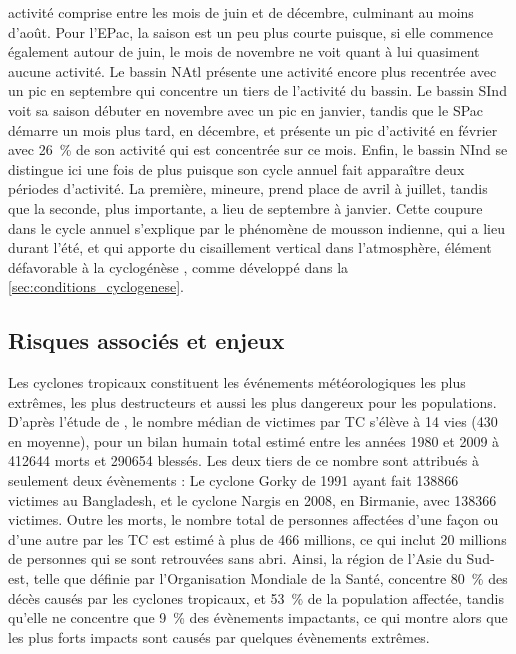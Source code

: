 \documentclass[../main.tex]{subfiles}
\begin{document}
activité comprise entre les mois de juin et de décembre, culminant au moins d'août. Pour l'EPac, la saison est un peu plus courte puisque, si elle commence
également autour de juin, le mois de novembre ne voit quant à lui quasiment aucune activité. Le bassin NAtl présente une activité encore plus recentrée avec un
pic en septembre qui concentre un tiers de l'activité du bassin. Le bassin SInd voit sa saison débuter en novembre avec un pic en janvier, tandis que le SPac
démarre un mois plus tard, en décembre, et présente un pic d'activité en février avec \SI{26}{\percent} de son activité qui est concentrée sur ce mois. Enfin,
le bassin NInd se distingue ici une fois de plus puisque son cycle annuel fait apparaître deux périodes d'activité. La première, mineure, prend place de avril à
juillet, tandis que la seconde, plus importante, a lieu de septembre à janvier. Cette coupure dans le cycle annuel s'explique par le phénomène de mousson
indienne, qui a lieu durant l'été, et qui apporte du cisaillement vertical dans l'atmosphère, élément défavorable à la cyclogénèse \parencite{gray_global_1968},
comme développé dans la \cref{sec:conditions_cyclogenese}.

\subsection{Risques associés et enjeux}

Les cyclones tropicaux constituent les événements météorologiques les plus extrêmes, les plus destructeurs et aussi les plus dangereux pour les populations.
D'après l'étude de \cite{doocy_human_2013}, le nombre médian de victimes par TC s'élève à \num{14} vies (\num{430} en moyenne), pour un bilan humain total
estimé entre les années 1980 et 2009 à \num{412644} morts et \num{290654} blessés. Les deux tiers de ce nombre sont attribués à seulement deux évènements : Le
cyclone Gorky de 1991 ayant fait \num{138866} victimes au Bangladesh, et le cyclone Nargis en 2008, en Birmanie, avec \num{138366} victimes. Outre les morts, le
nombre total de personnes affectées d'une façon ou d'une autre par les TC est estimé à plus de \num{466} millions, ce qui inclut \num{20} millions de personnes
qui se sont retrouvées sans abri. Ainsi, la région de l'Asie du Sud-est, telle que définie par l'Organisation Mondiale de la Santé, concentre \SI{80}{\percent}
des décès causés par les cyclones tropicaux, et \SI{53}{\percent} de la population affectée, tandis qu'elle ne concentre que \SI{9}{\percent} des évènements
impactants, ce qui montre alors que les plus forts impacts sont causés par quelques évènements extrêmes.
\end{document}
